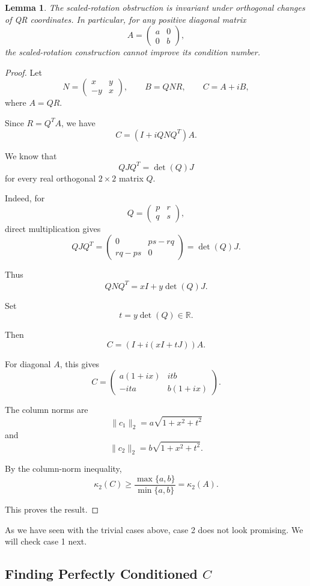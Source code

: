 \documentclass[11pt, reqno, a4paper]{amsart}
\theoremstyle{plain}
\newtheorem{lemma}[theorem]{Lemma}
\theoremstyle{definition}
\theoremstyle{remark}
\numberwithin{equation}{section}
\begin{document}
\begin{lemma}
The scaled-rotation obstruction is invariant under orthogonal changes of QR coordinates. In particular, for any positive diagonal matrix
\[
A=\begin{pmatrix}a&0\\0&b\end{pmatrix},
\]
the scaled-rotation construction cannot improve its condition number.
\end{lemma}

\begin{proof}
Let
\[
N=
\begin{pmatrix}
x&y\\
-y&x
\end{pmatrix},
\qquad
B=QNR,
\qquad
C=A+iB,
\]
where $A=QR$.

Since $R=Q^TA$, we have
\[
C=(I+iQNQ^T)A.
\]

We know that
\[
QJQ^T=\det(Q)J
\]
for every real orthogonal $2\times2$ matrix $Q$.

Indeed, for
\[
Q=
\begin{pmatrix}
p&r\\
q&s
\end{pmatrix},
\]
direct multiplication gives
\[
QJQ^T
=
\begin{pmatrix}
0&ps-rq\\
rq-ps&0
\end{pmatrix}
=
\det(Q)J.
\]

Thus
\[
QNQ^T=xI+y\det(Q)J.
\]

Set
\[
t=y\det(Q)\in\mathbb{R}.
\]

Then
\[
C=(I+i(xI+tJ))A.
\]

For diagonal $A$, this gives
\[
C=
\begin{pmatrix}
a(1+ix)&itb\\
-ita&b(1+ix)
\end{pmatrix}.
\]

The column norms are
\[
\|c_1\|_2=a\sqrt{1+x^2+t^2}
\]
and
\[
\|c_2\|_2=b\sqrt{1+x^2+t^2}.
\]

By the column-norm inequality,
\[
\kappa_2(C)
\geq
\frac{\max\{a,b\}}{\min\{a,b\}}
=
\kappa_2(A).
\]

This proves the result.
\end{proof}

As we have seen with the trivial cases above, case 2 does not look promising. We will check case 1 next.

\subsection{Finding Perfectly Conditioned $C$}
\end{document}
